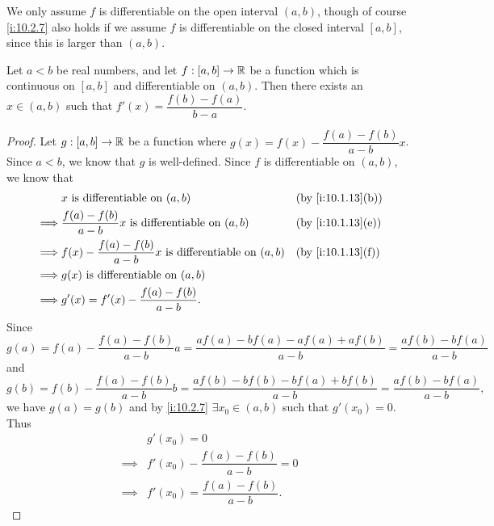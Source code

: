\begin{rmk}\label{i:10.2.8}
  We only assume \(f\) is differentiable on the open interval \((a, b)\), though of course \cref{i:10.2.7} also holds if we assume \(f\) is differentiable on the closed interval \([a, b]\), since this is larger than \((a, b)\).
\end{rmk}

\begin{cor}\label{i:10.2.9}
  Let \(a < b\) be real numbers, and let \(f : [a, b] \to \mathbb{R}\) be a function which is continuous on \([a, b]\) and differentiable on \((a, b)\).
  Then there exists an \(x \in (a, b)\) such that \(f'(x) = \dfrac{f(b) - f(a)}{b - a}\).
\end{cor}

\begin{proof}
  Let \(g : [a, b] \to \mathbb{R}\) be a function where \(g(x) = f(x) - \dfrac{f(a) - f(b)}{a - b} x\).
  Since \(a < b\), we know that \(g\) is well-defined.
  Since \(f\) is differentiable on \((a, b)\), we know that
  \begin{align*}
             & x \text{ is differentiable on } (a, b)                                   &  & \by{i:10.1.13}[b] \\
    \implies & \dfrac{f(a) - f(b)}{a - b} x \text{ is differentiable on } (a, b)        &  & \by{i:10.1.13}[e] \\
    \implies & f(x) - \dfrac{f(a) - f(b)}{a - b} x \text{ is differentiable on } (a, b) &  & \by{i:10.1.13}[f] \\
    \implies & g(x) \text{ is differentiable on } (a, b)                                                       \\
    \implies & g'(x) = f'(x) - \dfrac{f(a) - f(b)}{a - b}.
  \end{align*}
  Since
  \[
    g(a) = f(a) - \dfrac{f(a) - f(b)}{a - b} a = \dfrac{af(a) - bf(a) - af(a) + af(b)}{a - b} = \dfrac{af(b) - bf(a)}{a - b}
  \]
  and
  \[
    g(b) = f(b) - \dfrac{f(a) - f(b)}{a - b} b = \dfrac{af(b) - bf(b) - bf(a) + bf(b)}{a - b} = \dfrac{af(b) - bf(a)}{a - b},
  \]
  we have \(g(a) = g(b)\) and by \cref{i:10.2.7} \(\exists x_0 \in (a, b)\) such that \(g'(x_0) = 0\).
  Thus
  \begin{align*}
             & g'(x_0) = 0                              \\
    \implies & f'(x_0) - \dfrac{f(a) - f(b)}{a - b} = 0 \\
    \implies & f'(x_0) = \dfrac{f(a) - f(b)}{a - b}.
  \end{align*}
\end{proof}

